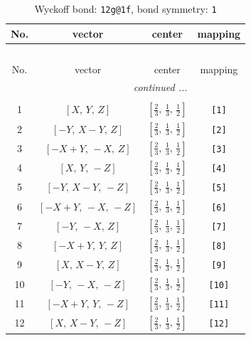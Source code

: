 \documentclass[fleqn,8pt]{jsarticle}
\begin{document}
\begin{longtable}{cccc}
\caption{Wyckoff bond: {\tt 12g@1f}, bond symmetry: {\tt 1}}
 \\
 \hline \hline
No. & vector & center & mapping \\ \hline \endfirsthead

\multicolumn{3}{l}{\tablename\ \thetable{}} \\
 \hline \hline
No. & vector & center & mapping \\ \hline \endhead

 \hline \hline
\multicolumn{3}{r}{\footnotesize\it continued ...} \\ \endfoot

 \hline \hline
\multicolumn{3}{r}{} \\ \endlastfoot

1 & $\left[ X,\, Y,\, Z \right]$ & $\left[ \frac{2}{3},\, \frac{1}{3},\, \frac{1}{2} \right]$ & {\tt [1]} \\ \hline
2 & $\left[ - Y,\, X - Y,\, Z \right]$ & $\left[ \frac{2}{3},\, \frac{1}{3},\, \frac{1}{2} \right]$ & {\tt [2]} \\ \hline
3 & $\left[ - X + Y,\, - X,\, Z \right]$ & $\left[ \frac{2}{3},\, \frac{1}{3},\, \frac{1}{2} \right]$ & {\tt [3]} \\ \hline
4 & $\left[ X,\, Y,\, - Z \right]$ & $\left[ \frac{2}{3},\, \frac{1}{3},\, \frac{1}{2} \right]$ & {\tt [4]} \\ \hline
5 & $\left[ - Y,\, X - Y,\, - Z \right]$ & $\left[ \frac{2}{3},\, \frac{1}{3},\, \frac{1}{2} \right]$ & {\tt [5]} \\ \hline
6 & $\left[ - X + Y,\, - X,\, - Z \right]$ & $\left[ \frac{2}{3},\, \frac{1}{3},\, \frac{1}{2} \right]$ & {\tt [6]} \\ \hline
7 & $\left[ - Y,\, - X,\, Z \right]$ & $\left[ \frac{2}{3},\, \frac{1}{3},\, \frac{1}{2} \right]$ & {\tt [7]} \\ \hline
8 & $\left[ - X + Y,\, Y,\, Z \right]$ & $\left[ \frac{2}{3},\, \frac{1}{3},\, \frac{1}{2} \right]$ & {\tt [8]} \\ \hline
9 & $\left[ X,\, X - Y,\, Z \right]$ & $\left[ \frac{2}{3},\, \frac{1}{3},\, \frac{1}{2} \right]$ & {\tt [9]} \\ \hline
10 & $\left[ - Y,\, - X,\, - Z \right]$ & $\left[ \frac{2}{3},\, \frac{1}{3},\, \frac{1}{2} \right]$ & {\tt [10]} \\ \hline
11 & $\left[ - X + Y,\, Y,\, - Z \right]$ & $\left[ \frac{2}{3},\, \frac{1}{3},\, \frac{1}{2} \right]$ & {\tt [11]} \\ \hline
12 & $\left[ X,\, X - Y,\, - Z \right]$ & $\left[ \frac{2}{3},\, \frac{1}{3},\, \frac{1}{2} \right]$ & {\tt [12]} \\
\end{longtable}
\end{document}
